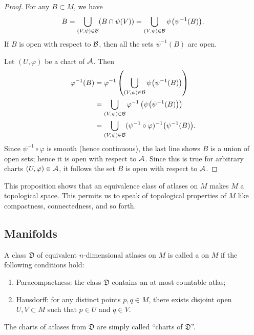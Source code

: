 \begin{proof}
  For any $B\subset M$, we have
  \begin{equation}
B = \bigcup_{(V,\psi)\in\mathcal{B}}(B\cap\psi(V))
  = \bigcup_{(V,\psi)\in\mathcal{B}}\psi\bigl(\psi^{-1}(B)\bigr).
  \end{equation}
If $B$ is open with respect to $\mathcal{B}$, then all the sets
$\psi^{-1}(B)$ are open.

Let $(U,\varphi)$ be a chart of $\mathcal{A}$. Then
\begin{subequations}
\begin{align}
\varphi^{-1}(B) 
&=\varphi^{-1}\left(\bigcup_{(V,\psi)\in\mathcal{B}}\psi\bigl(\psi^{-1}(B)\bigr)\right)\\
&= \bigcup_{(V,\psi)\in\mathcal{B}}\varphi^{-1}\left(\psi\bigl(\psi^{-1}(B)\bigr)\right)\\
&= \bigcup_{(V,\psi)\in\mathcal{B}} (\psi^{-1}\circ\varphi)^{-1}\bigl(\psi^{-1}(B)\bigr).
\end{align}
\end{subequations}
Since $\psi^{-1}\circ\varphi$ is smooth (hence continuous), the last
line shows $B$ is a union of open sets; hence it is open with respect to
$\mathcal{A}$. Since this is true for arbitrary charts $(U,\varphi)\in\mathcal{A}$,
it follows the set $B$ is open with respect to $\mathcal{A}$.
\end{proof}

\begin{remark}
This proposition shows that an equivalence class of atlases on $M$ makes
$M$ a topological space. This permits us to speak of topological
properties of $M$ like compactness, connectedness, and so forth.
\end{remark}

\subsection{Manifolds}

\begin{definition}
A class $\mathfrak{D}$ of equivalent $n$-dimensional atlases on $M$ is
called a  on $M$ if the following
conditions hold:
\begin{enumerate}
\item Paracompactness: the class $\mathfrak{D}$ contains an at-most countable atlas;
\item Hausdorff: for any distinct points $p,q\in M$, there exists
  disjoint open $U,V\subset M$ such that $p\in U$ and $q\in V$.
\end{enumerate}
The charts of atlases from $\mathfrak{D}$ are simply called ``charts of $\mathfrak{D}$''.
\end{definition}

